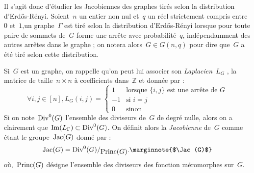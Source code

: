 \vspace*{0.3cm}
	Il s'agit donc d'étudier les Jacobiennes des graphes tirés selon la distribution d'Erd\H{o}s-Rényi. Soient~$n$ un entier non nul et~$q$ un réel strictement compris entre~$0$ et~$1$,un graphe~$\Gamma$ est tiré selon la distribution d'Erd\H{o}s-Rényi lorsque pour toute paire de sommets de~$G$ forme une arrête avec probabilité~$q$, indépendamment des autres arrêtes dans le graphe ; on notera alors~$G\in G(n,q)$ pour dire que~$G$ a été tiré selon cette distribution.
	
	Si~$G$ est un graphe, on rappelle qu'on peut lui associer son \emph{Laplacien}~$L_G$ , la matrice de taille~$n\times n$ à coefficients dans~$\mathbb{Z}$ et donnée par :
	\[
		\forall i,j\in[n], L_G(i,j) = 
			\begin{cases}
				1 &\text{lorsque }\{i,j\}\text{ est une arrête de }G\\
				-1 &\text{si }i=j\\
				0 &\text{sinon}
			\end{cases}
	\]
	Si on note~$\operatorname{Div}^0(G)$ l'ensemble des diviseurs de~$G$ de degré nulle, alors on a clairement que~$\operatorname{Im}(L_\Gamma) \subset \operatorname{Div}^0(G)$. On définit alors la \emph{Jacobienne} de~$G$ comme étant le groupe~$\operatorname{Jac}(G)$ donné par :
	\[
		\Jac(G) = \quotient{\Div^0(G)}{\Princ(G)}.\text{\marginnote{$\Jac(G)$}}
	\]
	où,~$\operatorname{Princ}(G)$ désigne l'ensemble des diviseurs des fonction méromorphes sur~$G$.